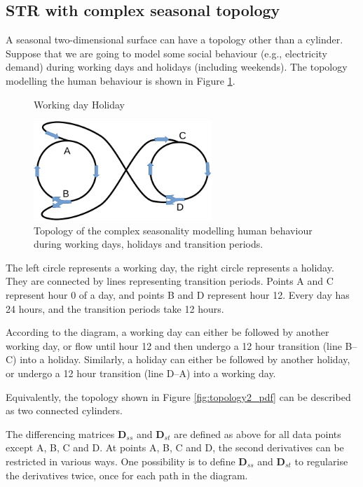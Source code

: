 \documentclass[11pt,a4paper,]{article}
\begin{document}
\hypertarget{sec:complex-topology}{%
\subsection{STR with complex seasonal topology}\label{sec:complex-topology}}

A seasonal two-dimensional surface can have a topology other than a cylinder. Suppose that we are going to model some social behaviour (e.g., electricity demand) during working days and holidays (including weekends). The topology modelling the human behaviour is shown in Figure \ref{fig:topology_pdf}.

\begin{figure}
  \centering
  \centerline{Working day \hspace*{4.5cm} Holiday}
  \includegraphics[width=0.6\textwidth]{topology.pdf}
  \caption{Topology of the complex seasonality modelling human behaviour during working days, holidays and transition periods.}
  \label{fig:topology_pdf}
\end{figure}

The left circle represents a working day, the right circle represents a holiday. They are connected by lines representing transition periods. Points A and C represent hour 0 of a day, and points B and D represent hour 12. Every day has 24 hours, and the transition periods take 12 hours.

According to the diagram, a working day can either be followed by another working day, or flow until hour 12 and then undergo a 12 hour transition (line B--C) into a holiday. Similarly, a holiday can either be followed by another holiday, or undergo a 12 hour transition (line D--A) into a working day.

Equivalently, the topology shown in Figure \ref{fig:topology2_pdf} can be described as two connected cylinders.

The differencing matrices \(\bm{D}_{ss}\) and \(\bm{D}_{st}\) are defined as above for all data points except A, B, C and D. At points A, B, C and D, the second derivatives can be restricted in various ways. One possibility is to define \(\bm{D}_{ss}\) and \(\bm{D}_{st}\) to regularise the derivatives twice, once for each path in the diagram.
\end{document}
